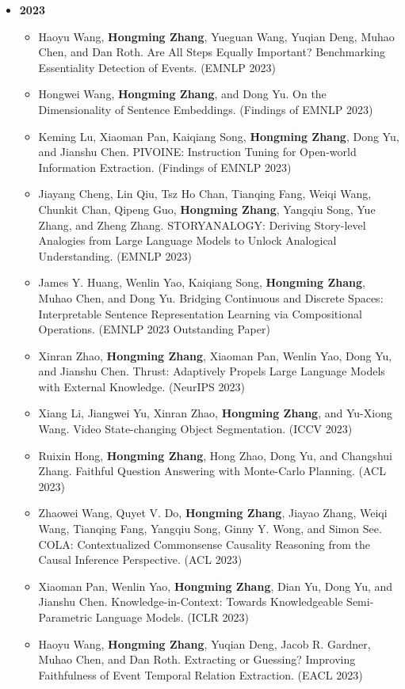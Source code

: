 \begin{itemize}[leftmargin=*, itemsep=0.35em, topsep=0.2em]
  \item[] \textbf{2023}
  \begin{itemize}[leftmargin=1.5em, itemsep=0.2em, topsep=0.1em]
    \item Haoyu Wang, \textbf{Hongming Zhang}, Yueguan Wang, Yuqian Deng, Muhao Chen, and Dan Roth. Are All Steps Equally Important? Benchmarking Essentiality Detection of Events. (EMNLP 2023)
    \item Hongwei Wang, \textbf{Hongming Zhang}, and Dong Yu. On the Dimensionality of Sentence Embeddings. (Findings of EMNLP 2023)
    \item Keming Lu, Xiaoman Pan, Kaiqiang Song, \textbf{Hongming Zhang}, Dong Yu, and Jianshu Chen. PIVOINE: Instruction Tuning for Open-world Information Extraction. (Findings of EMNLP 2023)
    \item Jiayang Cheng, Lin Qiu, Tsz Ho Chan, Tianqing Fang, Weiqi Wang, Chunkit Chan, Qipeng Guo, \textbf{Hongming Zhang}, Yangqiu Song, Yue Zhang, and Zheng Zhang. STORYANALOGY: Deriving Story-level Analogies from Large Language Models to Unlock Analogical Understanding. (EMNLP 2023)
    \item James Y. Huang, Wenlin Yao, Kaiqiang Song, \textbf{Hongming Zhang}, Muhao Chen, and Dong Yu. Bridging Continuous and Discrete Spaces: Interpretable Sentence Representation Learning via Compositional Operations. (EMNLP 2023 Outstanding Paper)
    \item Xinran Zhao, \textbf{Hongming Zhang}, Xiaoman Pan, Wenlin Yao, Dong Yu, and Jianshu Chen. Thrust: Adaptively Propels Large Language Models with External Knowledge. (NeurIPS 2023)
    \item Xiang Li, Jiangwei Yu, Xinran Zhao, \textbf{Hongming Zhang}, and Yu-Xiong Wang. Video State-changing Object Segmentation. (ICCV 2023)
    \item Ruixin Hong, \textbf{Hongming Zhang}, Hong Zhao, Dong Yu, and Changshui Zhang. Faithful Question Answering with Monte-Carlo Planning. (ACL 2023)
    \item Zhaowei Wang, Quyet V. Do, \textbf{Hongming Zhang}, Jiayao Zhang, Weiqi Wang, Tianqing Fang, Yangqiu Song, Ginny Y. Wong, and Simon See. COLA: Contextualized Commonsense Causality Reasoning from the Causal Inference Perspective. (ACL 2023)
    \item Xiaoman Pan, Wenlin Yao, \textbf{Hongming Zhang}, Dian Yu, Dong Yu, and Jianshu Chen. Knowledge-in-Context: Towards Knowledgeable Semi-Parametric Language Models. (ICLR 2023)
    \item Haoyu Wang, \textbf{Hongming Zhang}, Yuqian Deng, Jacob R. Gardner, Muhao Chen, and Dan Roth. Extracting or Guessing? Improving Faithfulness of Event Temporal Relation Extraction. (EACL 2023)

\end{itemize}
\end{itemize}
